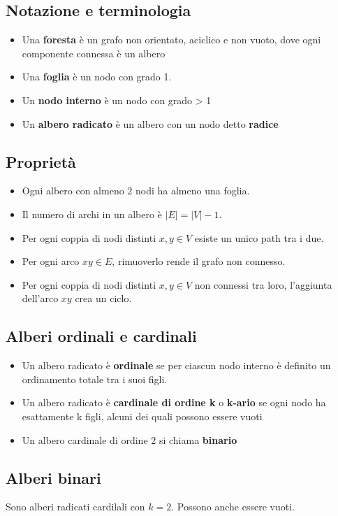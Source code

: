 \documentclass{article}
\begin{document}
\subsection*{Notazione e terminologia}
\begin{itemize}
    \item Una \textbf{foresta} è un grafo non orientato, aciclico e non vuoto, dove ogni componente connessa è un albero
    \item Una \textbf{foglia} è un nodo con grado 1.
    \item Un \textbf{nodo interno} è un nodo con grado > 1
    \item Un \textbf{albero radicato} è un albero con un nodo  detto \textbf{radice}
\end{itemize}
\subsection*{Proprietà}
\begin{itemize}
    \item Ogni albero con almeno 2 nodi ha almeno una foglia.
    \item Il numero di archi in un albero è \(\lvert E \rvert = \lvert V \rvert - 1\).
    \item Per ogni coppia di nodi distinti \(x,y \in V\) esiste un unico path tra i due.
    \item Per ogni arco \(xy \in E\), rimuoverlo rende il grafo non connesso.
    \item Per ogni coppia di nodi distinti \(x,y \in V\) non connessi tra loro, l'aggiunta dell'arco \(xy\) crea un ciclo.
\end{itemize}
\subsection*{Alberi ordinali e cardinali}
\begin{itemize}
    \item Un albero radicato è \textbf{ordinale} se per ciascun nodo interno è definito un ordinamento totale tra i suoi  figli.
    \item Un albero radicato è \textbf{cardinale di ordine k} o \textbf{k-ario} se ogni nodo ha esattamente k figli, alcuni dei quali possono essere vuoti
    \item Un albero cardinale di ordine 2 si chiama \textbf{binario}
\end{itemize}
\subsection*{Alberi binari}
Sono alberi radicati cardilali con \(k = 2\). Possono anche essere vuoti.
\end{document}
